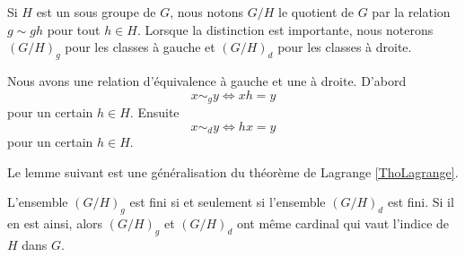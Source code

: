 Si \( H\) est un sous groupe de  \( G\), nous notons \( G/H\) le quotient de $G$ par la relation \( g\sim gh\) pour tout \( h\in H\). Lorsque la distinction est importante, nous noterons \( (G/H)_g\) pour les classes à gauche et \( (G/H)_d\) pour les classes à droite.

Nous avons une relation d'équivalence à gauche et une à droite. D'abord
\begin{equation}
    x\sim_g y\Leftrightarrow xh=y
\end{equation}
pour un certain \( h\in H\). Ensuite
\begin{equation}
    x\sim_d y\Leftrightarrow hx=y
\end{equation}
pour un certain \( h\in H\). 

Le lemme suivant est une généralisation du théorème de Lagrange \ref{ThoLagrange}.

\begin{lemma}
    L'ensemble \( (G/H)_g\) est fini si et seulement si l'ensemble \( (G/H)_d\) est fini. Si il en est ainsi, alors \( (G/H)_g\) et \( (G/H)_d\) ont même cardinal qui vaut l'indice de \( H\) dans \( G\).
\end{lemma}

